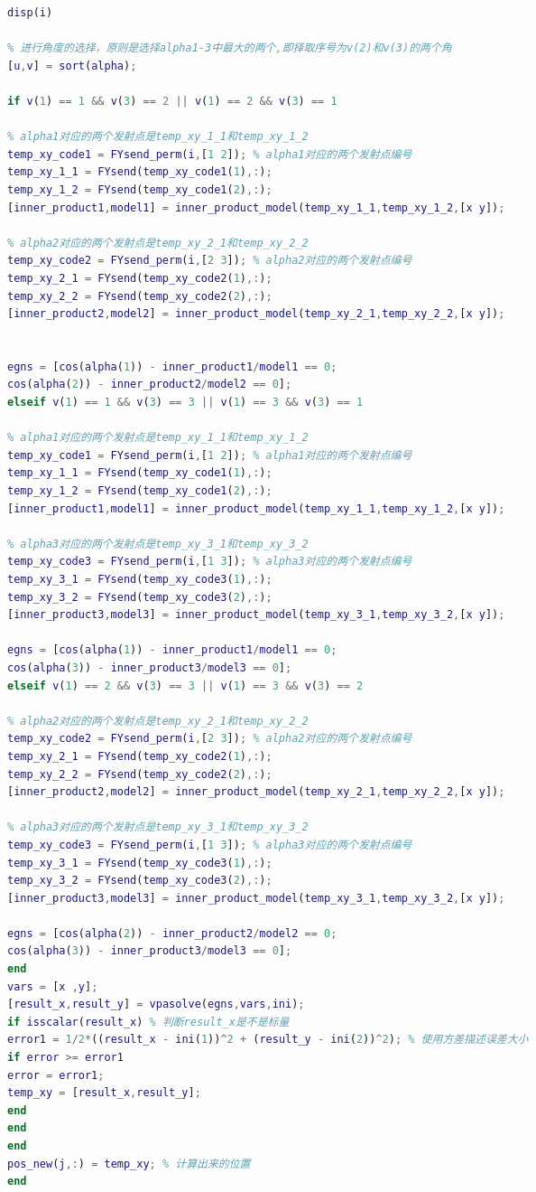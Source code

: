 \documentclass[12pt]{ctexart}
\begin{document}
\begin{spacing}{1.5}
\begin{lstlisting}[title="shumo\_B\_222.m",language=matlab]
disp(i)

% 进行角度的选择，原则是选择alpha1-3中最大的两个,即择取序号为v(2)和v(3)的两个角
[u,v] = sort(alpha);

if v(1) == 1 && v(3) == 2 || v(1) == 2 && v(3) == 1

% alpha1对应的两个发射点是temp_xy_1_1和temp_xy_1_2
temp_xy_code1 = FYsend_perm(i,[1 2]); % alpha1对应的两个发射点编号
temp_xy_1_1 = FYsend(temp_xy_code1(1),:);
temp_xy_1_2 = FYsend(temp_xy_code1(2),:);
[inner_product1,model1] = inner_product_model(temp_xy_1_1,temp_xy_1_2,[x y]);

% alpha2对应的两个发射点是temp_xy_2_1和temp_xy_2_2
temp_xy_code2 = FYsend_perm(i,[2 3]); % alpha2对应的两个发射点编号
temp_xy_2_1 = FYsend(temp_xy_code2(1),:);
temp_xy_2_2 = FYsend(temp_xy_code2(2),:);
[inner_product2,model2] = inner_product_model(temp_xy_2_1,temp_xy_2_2,[x y]);


egns = [cos(alpha(1)) - inner_product1/model1 == 0;
cos(alpha(2)) - inner_product2/model2 == 0];
elseif v(1) == 1 && v(3) == 3 || v(1) == 3 && v(3) == 1

% alpha1对应的两个发射点是temp_xy_1_1和temp_xy_1_2
temp_xy_code1 = FYsend_perm(i,[1 2]); % alpha1对应的两个发射点编号
temp_xy_1_1 = FYsend(temp_xy_code1(1),:);
temp_xy_1_2 = FYsend(temp_xy_code1(2),:);
[inner_product1,model1] = inner_product_model(temp_xy_1_1,temp_xy_1_2,[x y]);

% alpha3对应的两个发射点是temp_xy_3_1和temp_xy_3_2
temp_xy_code3 = FYsend_perm(i,[1 3]); % alpha3对应的两个发射点编号
temp_xy_3_1 = FYsend(temp_xy_code3(1),:);
temp_xy_3_2 = FYsend(temp_xy_code3(2),:);
[inner_product3,model3] = inner_product_model(temp_xy_3_1,temp_xy_3_2,[x y]);

egns = [cos(alpha(1)) - inner_product1/model1 == 0;
cos(alpha(3)) - inner_product3/model3 == 0];
elseif v(1) == 2 && v(3) == 3 || v(1) == 3 && v(3) == 2

% alpha2对应的两个发射点是temp_xy_2_1和temp_xy_2_2
temp_xy_code2 = FYsend_perm(i,[2 3]); % alpha2对应的两个发射点编号
temp_xy_2_1 = FYsend(temp_xy_code2(1),:);
temp_xy_2_2 = FYsend(temp_xy_code2(2),:);
[inner_product2,model2] = inner_product_model(temp_xy_2_1,temp_xy_2_2,[x y]);

% alpha3对应的两个发射点是temp_xy_3_1和temp_xy_3_2
temp_xy_code3 = FYsend_perm(i,[1 3]); % alpha3对应的两个发射点编号
temp_xy_3_1 = FYsend(temp_xy_code3(1),:);
temp_xy_3_2 = FYsend(temp_xy_code3(2),:);
[inner_product3,model3] = inner_product_model(temp_xy_3_1,temp_xy_3_2,[x y]);

egns = [cos(alpha(2)) - inner_product2/model2 == 0;
cos(alpha(3)) - inner_product3/model3 == 0];
end
vars = [x ,y];
[result_x,result_y] = vpasolve(egns,vars,ini);
if isscalar(result_x) % 判断result_x是不是标量
error1 = 1/2*((result_x - ini(1))^2 + (result_y - ini(2))^2); % 使用方差描述误差大小
if error >= error1
error = error1;
temp_xy = [result_x,result_y];
end
end
end
pos_new(j,:) = temp_xy; % 计算出来的位置
end


\end{lstlisting}
\end{spacing}
\end{document}
